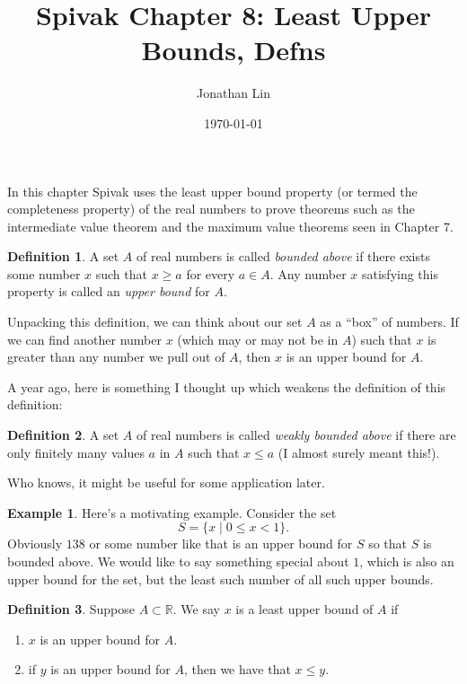 \documentclass[12pt]{article}
\title{Spivak Chapter 8: Least Upper Bounds, Defns}
\date{\today}
\author{Jonathan Lin}
\theoremstyle{definition}
\newtheorem{defn}{Definition}
\newtheorem{ex}{Example}
\theoremstyle{plain}
\begin{document}
\maketitle

In this chapter Spivak uses the least upper bound property (or termed the completeness property) of the real numbers to prove theorems such as the intermediate value theorem and the maximum value theorems seen in Chapter 7.

\begin{defn}
	A set $A$ of real numbers is called \textit{bounded above} if there exists some number $x$ such that $x \geq a$ for every $a \in A$.
	Any number $x$ satisfying this property is called an \textit{upper bound} for $A$.
\end{defn}

Unpacking this definition, we can think about our set $A$ as a ``box'' of numbers. If we can find another number $x$ (which may or may not be in $A$) such that $x$ is greater than any number we pull out of $A$, then $x$ is an upper bound for $A$.

A year ago, here is something I thought up which weakens the definition of this definition:

\begin{defn}
	A set $A$ of real numbers is called \textit{weakly bounded above} if there are only finitely many values $a$ in $A$ such that $x \leq a$
	(I almost surely meant this!).
\end{defn}

Who knows, it might be useful for some application later.

\begin{ex}
	Here's a motivating example. Consider the set \[ S = \{x \mid 0 \leq x < 1\}.\]
	Obviously $138$ or some number like that is an upper bound for $S$ so that $S$ is bounded above.
	We would like to say something special about $1$, which is also an upper bound for the set, but the least such
	number of all such upper bounds.
\end{ex}

\begin{defn}
Suppose $A \subset \mathbb{R}$. We say $x$ is a least upper bound of $A$ if
\begin{enumerate}
	\item $x$ is an upper bound for $A$.
	\item if $y$ is an upper bound for $A$, then we have that $x \leq y$.
\end{enumerate}

\end{defn}
\end{document}
